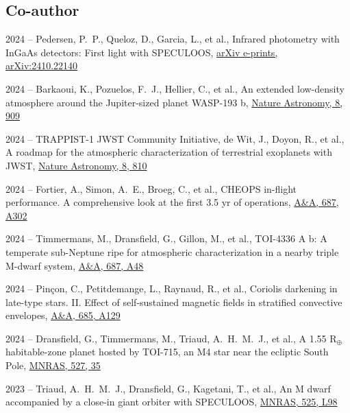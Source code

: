 \documentclass[10pt,letterpaper]{article}
\newcommand{\publi}[4]{\item #1 -- #3, #2, #4}
\newcommand{\mnras}{MNRAS}
\newcommand{\aap}{A\&A}
\begin{document}
\subsection*{Co-author}
\begin{etaremune}
    \publi{2024}{Infrared photometry with InGaAs detectors: First light with SPECULOOS}
    {Pedersen, P.~P., Queloz, D., Garcia, L., et al.}
    {\href{https://ui.adsabs.harvard.edu/abs/2024arXiv241022140P}{arXiv e-prints, arXiv:2410.22140}}

    \publi{2024}{An extended low-density atmosphere around the Jupiter-sized planet WASP-193 b}
    {Barkaoui, K., Pozuelos, F.~J., Hellier, C., et al.}
    {\href{https://ui.adsabs.harvard.edu/abs/2024NatAs...8..909B}{Nature Astronomy, 8, 909}}
    
    \publi{2024}{A roadmap for the atmospheric characterization of terrestrial exoplanets with JWST}
    {TRAPPIST-1 JWST Community Initiative, de Wit, J., Doyon, R., et al.}
    {\href{https://ui.adsabs.harvard.edu/abs/2024NatAs...8..810T}{Nature Astronomy, 8, 810}}
    
    \publi{2024}{CHEOPS in-flight performance. A comprehensive look at the first 3.5 yr of operations}
    {Fortier, A., Simon, A.~E., Broeg, C., et al.}
    {\href{https://ui.adsabs.harvard.edu/abs/2024A\&A...687A.302F}{\aap, 687, A302}}
    
    \publi{2024}{TOI-4336 A b: A temperate sub-Neptune ripe for atmospheric characterization in a nearby triple M-dwarf system}
    {Timmermans, M., Dransfield, G., Gillon, M., et al.}
    {\href{https://ui.adsabs.harvard.edu/abs/2024A\&A...687A..48T}{\aap, 687, A48}}
    
    \publi{2024}{Coriolis darkening in late-type stars. II. Effect of self-sustained magnetic fields in stratified convective envelopes}
    {Pin{\c{c}}on, C., Petitdemange, L., Raynaud, R., et al.}
    {\href{https://ui.adsabs.harvard.edu/abs/2024A\&A...685A.129P}{\aap, 685, A129}}
    
    \publi{2024}{A 1.55 R$_{{\ensuremath{\oplus}}}$ habitable-zone planet hosted by TOI-715, an M4 star near the ecliptic South Pole}
    {Dransfield, G., Timmermans, M., Triaud, A.~H.~M.~J., et al.}
    {\href{https://ui.adsabs.harvard.edu/abs/2024MNRAS.527...35D}{\mnras, 527, 35}}
    
    \publi{2023}{An M dwarf accompanied by a close-in giant orbiter with SPECULOOS}
    {Triaud, A.~H.~M.~J., Dransfield, G., Kagetani, T., et al.}
    {\href{https://ui.adsabs.harvard.edu/abs/2023MNRAS.525L..98T}{\mnras, 525, L98}}
    

\end{etaremune}
\end{document}
